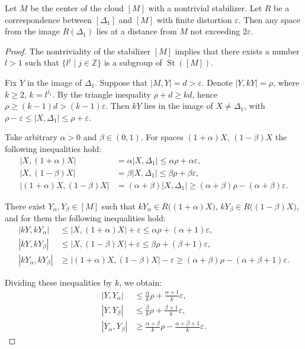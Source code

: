 \documentclass[10pt,a4paper]{amsart}
\begin{document}
\begin{theorem}\label{thrmCenterImage}
Let $M$ be the center of the cloud $[M]$ with a nontrivial stabilizer. Let $R$ be a correspondence between $[\Delta_{1}]$ and $[M]$ with finite distortion $\varepsilon$. Then any space from the image $R(\Delta_{1})$ lies at a distance from $M$ not exceeding $2\varepsilon$.
\end{theorem}

\begin{proof}
The nontriviality of the stabilizer $[M]$ implies that there exists a number $l > 1$ such that $\{l^{j} \mid j\in \mathbb{Z}\}$ is a subgroup of $\operatorname{St}([M])$.

Fix $Y$ in the image of $\Delta_{1}$. Suppose that $|M, Y| = d > \varepsilon$. Denote $|Y, kY| = \rho$, where $k \geq 2$, $k = l^{j_{1}}$. By the triangle inequality $\rho + d \geq kd$, hence $\rho \geq (k-1)d > (k-1)\varepsilon$. Then $kY$ lies in the image of $X \neq \Delta_1$, with $\rho - \varepsilon \leq |X, \Delta_1| \leq \rho + \varepsilon$.

Take arbitrary $\alpha > 0$ and $\beta \in (0,1)$. For spaces $(1+\alpha)X$, $(1-\beta)X$ the following inequalities hold:
\begin{align*}
|X, (1+\alpha)X| &= \alpha |X, \Delta_1| \leq \alpha\rho + \alpha\varepsilon, \\
|X, (1-\beta)X| &= \beta|X, \Delta_1| \leq \beta\rho + \beta\varepsilon, \\
|(1+\alpha) X, (1-\beta)X| &= (\alpha + \beta)|X, \Delta_1| \geq (\alpha+\beta)\rho - (\alpha+\beta)\varepsilon.
\end{align*}

There exist $Y_\alpha, Y_\beta \in [M]$ such that $kY_\alpha \in R\big((1+\alpha)X\big)$, $kY_\beta \in R\big((1-\beta)X\big)$, and for them the following inequalities hold:
\begin{align*}
|kY, kY_\alpha| &\leq |X, (1+\alpha)X| + \varepsilon \leq \alpha\rho + (\alpha+1)\varepsilon, \\
|kY, kY_\beta| &\leq |X, (1-\beta)X| + \varepsilon \leq \beta\rho + (\beta+1)\varepsilon, \\
|kY_\alpha, kY_\beta| &\geq |(1+\alpha)X, (1-\beta)X| - \varepsilon \geq (\alpha+\beta)\rho - (\alpha+\beta+1)\varepsilon.
\end{align*}

Dividing these inequalities by $k$, we obtain:
\begin{align*}
|Y, Y_{\alpha}| &\leq \frac{\alpha}{k}\rho + \frac{\alpha+1}{k}\varepsilon, \\
|Y, Y_{\beta}| &\leq \frac{\beta}{k}\rho + \frac{\beta+1}{k}\varepsilon, \\
|Y_\alpha, Y_{\beta}| &\geq \frac{\alpha+\beta}{k}\rho - \frac{\alpha+\beta+1}{k}\varepsilon.
\end{align*}


\end{proof}
\end{document}
